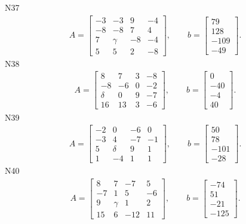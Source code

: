 \documentclass[11pt]{report}
\begin{document}
N37
\begin{align*}
 A = \left[\begin{matrix}-3 & -3 & 9 & -4\\-8 & -8 & 7 & 4\\7 & \gamma & -8 & -4\\5 & 5 & 2 & -8\end{matrix}\right],
\qquad b = \left[\begin{matrix}79\\128\\-109\\-49\end{matrix}\right]. 
 \end{align*}
N38
\begin{align*}
 A = \left[\begin{matrix}8 & 7 & 3 & -8\\-8 & -6 & 0 & -2\\\delta & 0 & 9 & -7\\16 & 13 & 3 & -6\end{matrix}\right],
\qquad b = \left[\begin{matrix}0\\-40\\-4\\40\end{matrix}\right]. 
 \end{align*}
N39
\begin{align*}
 A = \left[\begin{matrix}-2 & 0 & -6 & 0\\-3 & 4 & -7 & -1\\5 & \delta & 9 & 1\\1 & -4 & 1 & 1\end{matrix}\right],
\qquad b = \left[\begin{matrix}50\\78\\-101\\-28\end{matrix}\right]. 
 \end{align*}
N40
\begin{align*}
 A = \left[\begin{matrix}8 & 7 & -7 & 5\\-7 & 1 & 5 & -6\\9 & \gamma & 1 & 2\\15 & 6 & -12 & 11\end{matrix}\right],
\qquad b = \left[\begin{matrix}-74\\51\\-21\\-125\end{matrix}\right]. 
 \end{align*}
\end{document}
